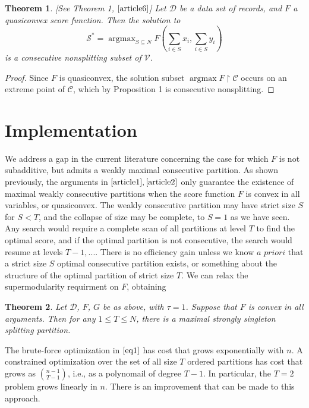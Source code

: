 \documentclass{article}
\newtheorem{thm}{Theorem}
\theoremstyle{case}
\DeclareMathOperator*{\argmax}{argmax} %
\begin{document}
\begin{thm} \label{thm3}
[See Theorem 1, $\cite{article6}$] Let $\mathcal{D}$ be a data set of records, and $F$ a quasiconvex score function. Then the solution to
\[
\mathcal{S^*} = \argmax_{S \subseteq N} F(\sum_{i \in S}x_i, \sum_{i \in S}y_i)
\]
is a consecutive nonsplitting subset of $\mathcal{V}$.
\end{thm}
\begin{proof}
Since $F$ is quasiconvex, the solution subset $\argmax F\restriction{\mathcal{C}}$ occurs on an extreme point of $\mathcal{C}$, which by Proposition 1 is consecutive nonsplitting.
\end{proof}

\section{Implementation}
We address a gap in the current literature concerning the case for which $F$ is not subadditive, but admits a weakly maximal consecutive partition. As shown previously, the arguments in $\cite{article1}, \cite{article2}$ only guarantee the existence of maximal weakly consecutive partitions when the score function $F$ is convex in all variables, or quasiconvex. The weakly consecutive partition may have strict size $S$ for $S < T$, and the collapse of size may be complete, to $S = 1$ as we have seen. Any search would require a complete scan of all partitions at level $T$ to find the optimal score, and if the optimal partition is not consecutive, the search would resume at levels $T-1, ...$. There is no efficiency gain unless we know $\textit{a priori}$ that a strict size $S$ optimal consecutive partition exists, or something about the structure of the optimal partition of strict size $T$. We can relax the supermodularity requirment on $F$, obtaining

\begin{thm} \label{thm3}
Let $\mathcal{D}$, $F$, $G$ be as above, with $\tau = 1$. Suppose that $F$ is convex in all arguments. Then for any $1 \leq T \leq N$, there is a maximal strongly singleton splitting partition.
\end{thm}


The brute-force optimization in $\ref{eq1}$ has cost that grows exponentially with $n$. A constrained optimization over the set of all size $T$ ordered partitions has cost that grows as $\binom{n-1}{T-1}$, i.e., as a polynomail of degree $T-1$. In particular, the $T = 2$ problem grows linearly in $n$. There is an improvement that can be made to this approach.
\end{document}
